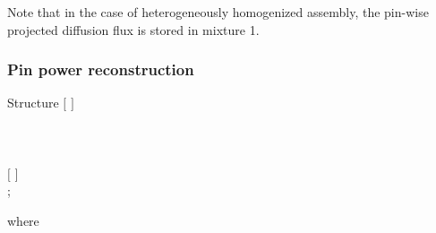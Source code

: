 Note that in the case of heterogeneously homogenized assembly, the pin-wise projected diffusion flux is stored in mixture 1.

\subsubsection{Pin power reconstruction}\label{sect:descnap2}

\begin{DataStructure}{Structure }
$[$   $]$ \\
\\
   \\ 
\\
$[$   $]$ \\
;
\end{DataStructure}

\noindent where

